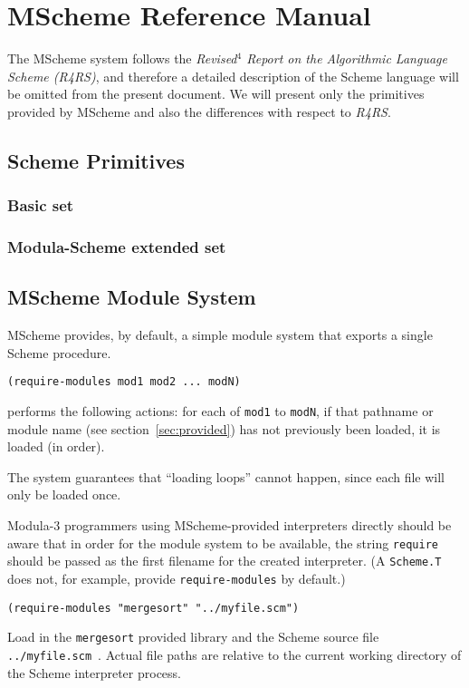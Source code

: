
\chapter{MScheme Reference Manual}

The MScheme system follows the {\it Revised$^4$ Report on the
  Algorithmic Language Scheme (R4RS)\/}, and therefore a detailed description
of the Scheme language will be omitted from the present document.  We will
present only the primitives provided by MScheme and also the differences
with respect to {\it R4RS\/}.

\section{Scheme Primitives}

\subsection{Basic set}

\subsection{Modula-Scheme extended set}

\section{MScheme Module System}\label{sec:modules}

MScheme provides, by default, a simple module system that exports a single
Scheme procedure.
\begin{verbatim}
(require-modules mod1 mod2 ... modN)
\end{verbatim}
performs the following actions: for each of {\tt mod1} to {\tt modN},
if that pathname or module name (see section~\ref{sec:provided}) has not
previously been loaded, it is loaded (in order).  

The system guarantees that ``loading loops'' cannot happen, since each
file will only be loaded once.

Modula-3 programmers using MScheme-provided interpreters directly
should be aware that in order for the module system to be available,
the string {\tt require} should be passed as the first filename for
the created interpreter.  (A {\tt Scheme.T} does not, for example,
provide {\tt require-modules} by default.)

\begin{verbatim}
(require-modules "mergesort" "../myfile.scm")
\end{verbatim}
Load in the {\tt mergesort} provided library and the Scheme source file
{\tt ../myfile.scm}\ .  Actual file paths are relative to the current working directory of the Scheme interpreter process.




